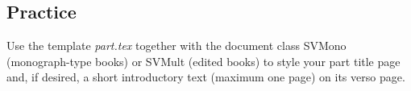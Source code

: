 
\begin{partbacktext}
\part{Practice}
\noindent Use the template \emph{part.tex} together with the document class SVMono (monograph-type books) or SVMult (edited books) to style your part title page and, if desired, a short introductory text (maximum one page) on its verso page.

\end{partbacktext}

